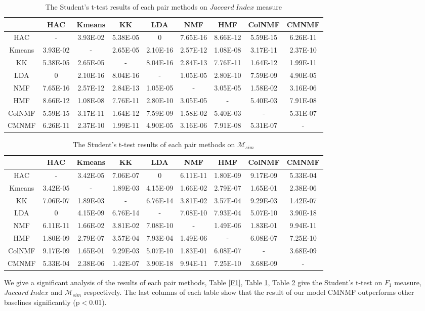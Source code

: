 \documentclass{article}
\begin{document}
\begin{table}[!h]
\centering
\caption{The Student's t-test results of each pair methods on $Jaccard\ Index$ measure}\label{JI}
\begin{tabular}{c|cccccccc}
\hline
&HAC &Kmeans& KK&LDA&NMF&HMF&ColNMF&CMNMF\\
\hline
HAC&- & 3.93E-02&5.38E-05&0&7.65E-16&8.66E-12&5.59E-15&6.26E-11\\
Kmeans&3.93E-02& -&2.65E-05&2.10E-16&2.57E-12&1.08E-08&3.17E-11&2.37E-10\\
KK&5.38E-05& 2.65E-05&-&8.04E-16&2.84E-13&7.76E-11&1.64E-12&1.99E-11\\
LDA&0&2.10E-16&8.04E-16&-&1.05E-05&2.80E-10&7.59E-09&4.90E-05\\
NMF&7.65E-16&2.57E-12&2.84E-13&1.05E-05&-&3.05E-05&1.58E-02&3.16E-06\\
HMF&8.66E-12&1.08E-08&7.76E-11&2.80E-10&3.05E-05&-&5.40E-03&7.91E-08\\
ColNMF &5.59E-15&3.17E-11&1.64E-12&7.59E-09&1.58E-02&5.40E-03&-&5.31E-07\\
CMNMF &6.26E-11&2.37E-10&1.99E-11&4.90E-05&3.16E-06&7.91E-08&5.31E-07&-\\
\hline
\end{tabular}
\end{table}
\begin{table}[!h]
\centering
\caption{The Student's t-test results of each pair methods on $\mathcal{M}_{sim}$}\label{M_sim}
\begin{tabular}{c|cccccccc}
\hline
&HAC &Kmeans& KK&LDA&NMF&HMF&ColNMF&CMNMF\\
\hline
HAC&- & 3.42E-05&7.06E-07&0&6.11E-11&1.80E-09&9.17E-09&5.33E-04\\
Kmeans&3.42E-05& -&1.89E-03&4.15E-09&1.66E-02&2.79E-07&1.65E-01&2.38E-06\\
KK&7.06E-07&1.89E-03&-&6.76E-14&3.81E-02&3.57E-04&9.29E-03&1.42E-07\\
LDA&0& 4.15E-09&6.76E-14&-&7.08E-10&7.93E-04&5.07E-10&3.90E-18\\
NMF&6.11E-11& 1.66E-02&3.81E-02&7.08E-10&-&1.49E-06&1.83E-01&9.94E-11\\
HMF&1.80E-09&2.79E-07&3.57E-04&7.93E-04&1.49E-06&-&6.08E-07&7.25E-10\\
ColNMF &9.17E-09&1.65E-01&9.29E-03&5.07E-10&1.83E-01&6.08E-07&-&3.68E-09\\
CMNMF &5.33E-04&2.38E-06&1.42E-07&3.90E-18&9.94E-11&7.25E-10&3.68E-09&-\\
\hline
\end{tabular}
\end{table}
We give a significant analysis of the results of each pair methods, Table \ref{F1}, Table \ref{JI}, Table \ref{M_sim} give the Student's t-test on $F_1$ measure, $Jaccard\ Index$ and $\mathcal{M}_{sim}$ respectively. The last columns of each table show that the result of our model CMNMF outperforms other baselines significantly (p$<$0.01).
\end{document}
